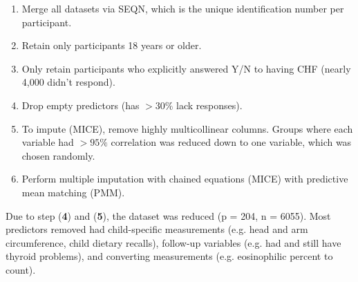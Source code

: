 \documentclass{article}
\begin{document}
\begin{enumerate}
	\item Merge all datasets via SEQN, which is the unique identification number per participant.
	\item Retain only participants 18 years or older.
	\item Only retain participants who explicitly answered Y/N to having CHF (nearly 4,000 didn't respond).
	\item Drop empty predictors (has $> 30\%$ lack responses).
	\item To impute (MICE), remove highly multicollinear columns. Groups where each variable had $>95\%$ correlation was reduced down to one variable, which was chosen randomly.
	\item Perform multiple imputation with chained equations (MICE) with predictive mean matching (PMM).
\end{enumerate}

Due to step (\textbf{4}) and (\textbf{5}), the dataset was reduced (p = 204, n = 6055). Most predictors removed had child-specific measurements (e.g. head and arm circumference, child dietary recalls), follow-up variables (e.g. had and still have thyroid problems), and converting measurements (e.g. eosinophilic percent to count). 

\vspace{-1em}

\end{document}
